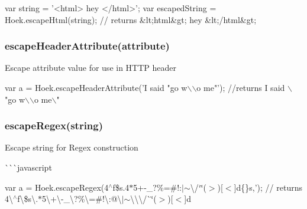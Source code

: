 \begin{DoxyCode}
var string = '<html> hey </html>';
var escapedString = Hoek.escapeHtml(string); // returns &lt;html&gt; hey &lt;/html&gt;
\end{DoxyCode}


\subsubsection*{escape\+Header\+Attribute(attribute)}

Escape attribute value for use in H\+T\+TP header


\begin{DoxyCode}
var a = Hoek.escapeHeaderAttribute('I said "go w\(\backslash\)\(\backslash\)o me"');  //returns I said \(\backslash\)"go w\(\backslash\)\(\backslash\)o me\(\backslash\)"
\end{DoxyCode}


\subsubsection*{escape\+Regex(string)}

Escape string for Regex construction

\`{}\`{}\`{}javascript

var a = Hoek.\+escape\+Regex(\textquotesingle{}4$^\wedge$f\$s.4$\ast$5+-\/\+\_\+?\%=\#!\+:$|$$\sim$\textbackslash{}/`\char`\"{}($>$)\mbox{[}$<$\mbox{]}d\{\}s,');  // returns 4\textbackslash{}$^\wedge$f\textbackslash{}\$s\textbackslash{}.$\ast$5\textbackslash{}+\textbackslash{}-\/\+\_\+\textbackslash{}?\%\textbackslash{}=\#!\textbackslash{}\+:@\textbackslash{}$\vert$$\sim$\textbackslash{}\textbackslash{}\textbackslash{}/\`{}\char`\"{}($>$)\mbox{[}$<$\mbox{]}d 